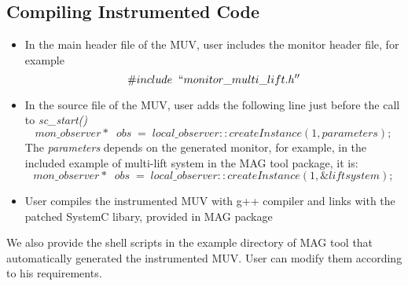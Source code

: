 \documentclass{llncs}
\begin{document}
\subsection{Compiling Instrumented Code}
\begin{itemize}
\item In the main header file of the MUV, user includes the monitor header file, for example
\begin{displaymath}
\#include \; \; ``monitor\_multi\_lift.h''
\end{displaymath}
\item In the source file of the MUV, user adds the following line just before the call to \textit{sc\_start()}
\begin{displaymath}
mon\_observer* \; \; obs \; = \; local\_observer::createInstance(1, parameters);
\end{displaymath}
The \textit{parameters} depends on the generated monitor, for example, in the included example of multi-lift system in the MAG tool package, it is:
\begin{displaymath}
mon\_observer* \; \; obs \; = \; local\_observer::createInstance(1, \&liftsystem);
\end{displaymath}
\item User compiles the instrumented MUV with g++ compiler and links with the patched SystemC libary, provided in MAG package
\end{itemize}
We also provide the shell scripts in the example directory of MAG tool that automatically generated the instrumented MUV. User can modify them according to his requirements.
\end{document}
